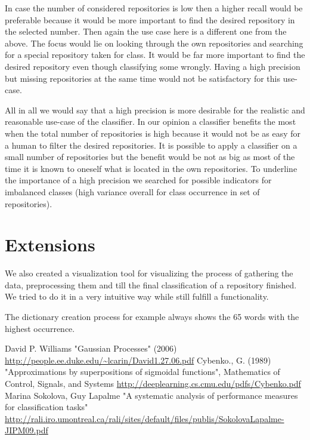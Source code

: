 \documentclass[paper=A4,pagesize=auto,12pt,headinclude=true,footinclude=true,BCOR=0mm,DIV=calc]{scrartcl}
\begin{document}
	In case the number of considered repositories is low then a higher recall would be preferable because it would be more important to find the desired repository in the selected number. Then again the use case here is a different one from the above. The focus would lie on looking through the own repositories and searching for a special repository taken for class. It would be far more important to find the desired repository even though classifying some wrongly. Having a high precision but missing repositories at the same time would not be satisfactory for this use-case.
	
	All in all we would say that a high precision is more desirable for the realistic and reasonable use-case of the classifier. In our opinion a classifier benefits the most when the total number of repositories is high because it would not be as easy for a human to filter the desired repositories. It is possible to apply a classifier on a small number of repositories but the benefit would be not as big as most of the time it is known to oneself what is located in the own repositories.
	To underline the importance of a high precision we searched for possible indicators for imbalanced classes (high variance overall for class occurrence in set of repositories).
	
	
	\section{Extensions}
		We also created a visualization tool for visualizing the process of gathering the data, preprocessing them and till the final classification of a repository finished. We tried to do it in a very intuitive way while still fulfill a functionality.
		
		The dictionary creation process for example always shows the 65 words with the highest occurrence.
	
	\newpage
	
	\begin{thebibliography}{xxxxxx}
		 David P. Williams "Gaussian Processes" (2006) \url{http://people.ee.duke.edu/~lcarin/David1.27.06.pdf}
		  Cybenko., G. (1989) "Approximations by superpositions of sigmoidal functions", Mathematics of Control, Signals, and Systems \url{http://deeplearning.cs.cmu.edu/pdfs/Cybenko.pdf}
		 Marina Sokolova, Guy Lapalme "A systematic analysis of performance measures for classification tasks" \url{http://rali.iro.umontreal.ca/rali/sites/default/files/publis/SokolovaLapalme-JIPM09.pdf}
	
	\end{thebibliography}
	
\end{document}
